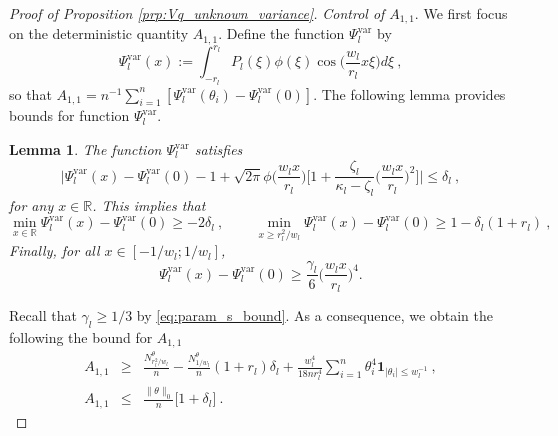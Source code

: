\documentclass[twoside,11pt]{article}
\newtheorem{lem}{Lemma}
\def\beq{\begin{equation}}
\def\eeq{\end{equation}}
\newcommand{\<}{\langle}
\renewcommand{\>}{\rangle}
\begin{document}
\begin{proof}[Proof of Proposition \ref{prp:Vq_unknown_variance}]
\noindent 
{\it Control of $A_{1,1}$}.
We first focus on the deterministic quantity $A_{1,1}$.  Define the function $\Psi^{\mathrm{var}}_l$ by 
\beq\label{eq:def_psi_l_log} 
\Psi^{\mathrm{var}}_l(x):=  \int_{-r_l}^{r_l} P_l(\xi)  \phi(\xi) \cos\big(\frac{ w_l}{r_l} x \xi \big)d\xi\ , 
\eeq
so that $A_{1,1}= n^{-1}\sum_{i=1}^n [\Psi^{\mathrm{var}}_l(\theta_i)-\Psi^{\mathrm{var}}_l(0)]$. The following lemma provides bounds for function $\Psi^{\mathrm{var}}_l$.

\begin{lem}\label{lem:computation_psi_l}
The function $\Psi^{\mathrm{var}}_l$ satisfies 
\beq \label{eq:lower_psi_l}
\Big|\Psi^{\mathrm{var}}_l(x)- \Psi^{\mathrm{var}}_l(0) - 1  + \sqrt{2\pi}\phi\big(\frac{w_lx}{r_l}\big)\big[1+ \frac{\zeta_l}{\kappa_l -\zeta_l}\big( \frac{w_lx}{r_l}\big)^2\big] \Big|\leq \delta_l \ , 
\eeq  
for any $x\in \mathbb{R}$. This implies that
\beq\label{eq:upper_psi_l_2}
\min_{x\in \mathbb{R}} \Psi^{\mathrm{var}}_l(x)- \Psi^{\mathrm{var}}_l(0)\geq - 2\delta_l\ , \quad  \, \quad \min_{x\geq r_l^2/w_l}\Psi^{\mathrm{var}}_l(x)- \Psi^{\mathrm{var}}_l(0)\geq 1 - \delta_l(1+r_l)\ ,
\eeq
Finally, for all  $x\in [-1/w_l; 1/w_l]$, 
\beq\label{eq:lower_psi_l_small_x2}
\Psi^{\mathrm{var}}_l(x) - \Psi^{\mathrm{var}}_l(0) \geq \frac{\gamma_l}{6}\big(\frac{w_l x}{r_l}\big)^4.
\eeq
\end{lem}
 Recall that $\gamma_l\geq 1/3$ by \eqref{eq:param_s_bound}.
As a consequence, we obtain the following the bound for $A_{1,1}$
\begin{eqnarray}
A_{1,1}&\geq & \frac{N_{r_l^2/w_l}^{\theta}}{n}  - \frac{N_{1/w_l}^{\theta}}{n} (1+r_l) \delta_l + \frac{ w_l^4}{18nr_l^4}\sum_{i=1}^n \theta_i^4 \mathbf{1}_{|\theta_i|\leq w_l^{-1}}   \label{eq:lower_T11}\ ,\\
A_{1,1}&\leq&\frac{\|\theta\|_0}{n}\big[1+ \delta_l\big]\ . \label{eq:upper_T11}
\end{eqnarray}







\bigskip 


\end{proof}
\end{document}
